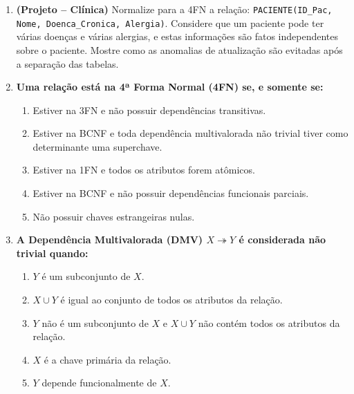 \documentclass[12pt]{article}
\begin{document}
\begin{enumerate}[label=\textbf{Questão \arabic*:}, leftmargin=*]
  \item \textbf{(Projeto -- Clínica)} Normalize para a 4FN a relação:
  \texttt{PACIENTE(ID\_Pac, Nome, Doenca\_Cronica, Alergia)}. 
  Considere que um paciente pode ter várias doenças e várias alergias, e estas informações são fatos independentes sobre o paciente. Mostre como as anomalias de atualização são evitadas após a separação das tabelas.

  \begin{center}
  \end{center}
  \begin{resposta}
  \end{resposta}



  \item \textbf{Uma relação está na 4ª Forma Normal (4FN) se, e somente se:}
  \begin{enumerate}[label=\alph*)]
    \item Estiver na 3FN e não possuir dependências transitivas.
    \item Estiver na BCNF e toda dependência multivalorada não trivial tiver como determinante uma superchave.
    \item Estiver na 1FN e todos os atributos forem atômicos.
    \item Estiver na BCNF e não possuir dependências funcionais parciais.
    \item Não possuir chaves estrangeiras nulas.
  \end{enumerate}

  \item \textbf{A Dependência Multivalorada (DMV) $X \twoheadrightarrow Y$ é considerada não trivial quando:}
  \begin{enumerate}[label=\alph*)]
    \item $Y$ é um subconjunto de $X$.
    \item $X \cup Y$ é igual ao conjunto de todos os atributos da relação.
    \item $Y$ não é um subconjunto de $X$ e $X \cup Y$ não contém todos os atributos da relação.
    \item $X$ é a chave primária da relação.
    \item $Y$ depende funcionalmente de $X$.
  \end{enumerate}


\end{enumerate}
\end{document}
